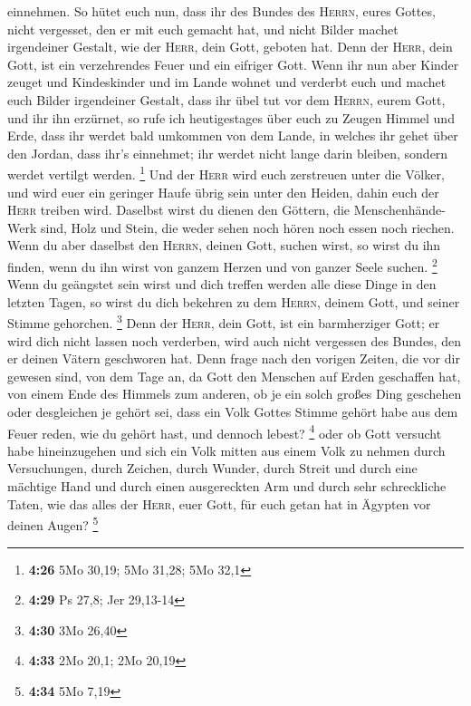 einnehmen.  So hütet euch nun, dass ihr des Bundes des
\textsc{Herrn}, eures Gottes, nicht vergesset, den er mit euch gemacht
hat, und nicht Bilder machet irgendeiner Gestalt, wie der \textsc{Herr},
dein Gott, geboten hat.  Denn der \textsc{Herr}, dein
Gott, ist ein verzehrendes Feuer und ein eifriger Gott. 
Wenn ihr nun aber Kinder zeuget und Kindeskinder und im Lande wohnet und
verderbt euch und machet euch Bilder irgendeiner Gestalt, dass ihr übel
tut vor dem \textsc{Herrn}, eurem Gott, und ihr ihn erzürnet,
 so rufe ich heutigestages über euch zu Zeugen Himmel und
Erde, dass ihr werdet bald umkommen von dem Lande, in welches ihr gehet
über den Jordan, dass ihr's einnehmet; ihr werdet nicht lange darin
bleiben, sondern werdet vertilgt werden. \footnote{\textbf{4:26} 5Mo
  30,19; 5Mo 31,28; 5Mo 32,1}  Und der \textsc{Herr} wird
euch zerstreuen unter die Völker, und wird euer ein geringer Haufe übrig
sein unter den Heiden, dahin euch der \textsc{Herr} treiben wird.
 Daselbst wirst du dienen den Göttern, die
Menschenhände-Werk sind, Holz und Stein, die weder sehen noch hören noch
essen noch riechen.  Wenn du aber daselbst den
\textsc{Herrn}, deinen Gott, suchen wirst, so wirst du ihn finden, wenn
du ihn wirst von ganzem Herzen und von ganzer Seele suchen. \footnote{\textbf{4:29}
  Ps 27,8; Jer 29,13-14}  Wenn du geängstet sein wirst
und dich treffen werden alle diese Dinge in den letzten Tagen, so wirst
du dich bekehren zu dem \textsc{Herrn}, deinem Gott, und seiner Stimme
gehorchen. \footnote{\textbf{4:30} 3Mo 26,40}  Denn der
\textsc{Herr}, dein Gott, ist ein barmherziger Gott; er wird dich nicht
lassen noch verderben, wird auch nicht vergessen des Bundes, den er
deinen Vätern geschworen hat.  Denn frage nach den
vorigen Zeiten, die vor dir gewesen sind, von dem Tage an, da Gott den
Menschen auf Erden geschaffen hat, von einem Ende des Himmels zum
anderen, ob je ein solch großes Ding geschehen oder desgleichen je
gehört sei,  dass ein Volk Gottes Stimme gehört habe aus
dem Feuer reden, wie du gehört hast, und dennoch lebest? \footnote{\textbf{4:33}
  2Mo 20,1; 2Mo 20,19}  oder ob Gott versucht habe
hineinzugehen und sich ein Volk mitten aus einem Volk zu nehmen durch
Versuchungen, durch Zeichen, durch Wunder, durch Streit und durch eine
mächtige Hand und durch einen ausgereckten Arm und durch sehr
schreckliche Taten, wie das alles der \textsc{Herr}, euer Gott, für euch
getan hat in Ägypten vor deinen Augen? \footnote{\textbf{4:34} 5Mo 7,19}
